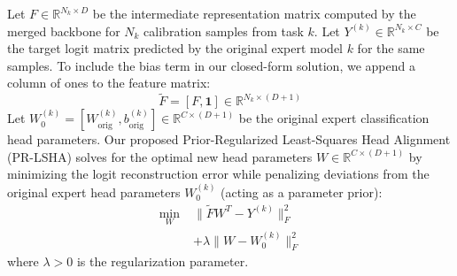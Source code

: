 \documentclass{article}
\theoremstyle{plain}
\theoremstyle{definition}
\theoremstyle{remark}
\begin{document}
Let $F \in \mathbb{R}^{N_k \times D}$ be the intermediate representation matrix computed by the merged backbone for $N_k$ calibration samples from task $k$. Let $Y^{(k)} \in \mathbb{R}^{N_k \times C}$ be the target logit matrix predicted by the original expert model $k$ for the same samples.
To include the bias term in our closed-form solution, we append a column of ones to the feature matrix:
\begin{equation}
    \tilde{F} = [F, \mathbf{1}] \in \mathbb{R}^{N_k \times (D+1)}
\end{equation}
Let $W_0^{(k)} = [W^{(k)}_{\text{orig}}, b^{(k)}_{\text{orig}}] \in \mathbb{R}^{C \times (D+1)}$ be the original expert classification head parameters. Our proposed Prior-Regularized Least-Squares Head Alignment (PR-LSHA) solves for the optimal new head parameters $W \in \mathbb{R}^{C \times (D+1)}$ by minimizing the logit reconstruction error while penalizing deviations from the original expert head parameters $W_0^{(k)}$ (acting as a parameter prior):
\begin{align}
    \min_{W} \; & \|\tilde{F} W^T - Y^{(k)}\|^2_F \nonumber \\
    & + \lambda \|W - W_0^{(k)}\|^2_F
\end{align}
where $\lambda > 0$ is the regularization parameter.
\end{document}
